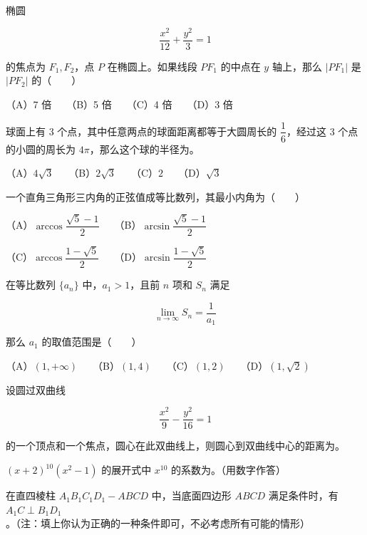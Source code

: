 \begin{question}
椭圆

\nopagebreak[4]
\[
\frac{x^2}{12}+\frac{y^2}{3}=1
\]

的焦点为 $F_1,F_2$，点 $P$ 在椭圆上。如果线段 $PF_1$ 的中点在 $y$ 轴上，那么 $|PF_1|$ 是 $|PF_2|$ 的\mbox{（　　）}

（A）7 倍　　（B）5 倍　　（C）4 倍　　（D）3 倍

\end{question}
\begin{question}
球面上有 3 个点，其中任意两点的球面距离都等于大圆周长的 $\dfrac16$，经过这 3 个点的小圆的周长为 $4\pi$，那么这个球的半径为\gkblank{}。

（A）$4\sqrt3$　　（B）$2\sqrt3$　　（C）$2$　　（D）$\sqrt3$

\end{question}
\begin{question}
一个直角三角形三内角的正弦值成等比数列，其最小内角为\mbox{（　　）}

（A）$\arccos\dfrac{\sqrt5-1}{2}$　　（B）$\arcsin\dfrac{\sqrt5-1}{2}$

（C）$\arccos\dfrac{1-\sqrt5}{2}$　　（D）$\arcsin\dfrac{1-\sqrt5}{2}$

\end{question}
\begin{question}
在等比数列 $\{a_n\}$ 中，$a_1>1$，且前 $n$ 项和 $S_n$ 满足

\nopagebreak[4]
\[
\lim_{n\to\infty}S_n=\frac1{a_1}
\]

那么 $a_1$ 的取值范围是\mbox{（　　）}

（A）$(1,+\infty)$　　（B）$(1,4)$　　（C）$(1,2)$　　（D）$(1,\sqrt2)$

\end{question}
\begin{question}
设圆过双曲线

\nopagebreak[4]
\[
\frac{x^2}{9}-\frac{y^2}{16}=1
\]

的一个顶点和一个焦点，圆心在此双曲线上，则圆心到双曲线中心的距离为\gkblank{}。

\end{question}
\begin{question}
$(x+2)^{10}(x^2-1)$ 的展开式中 $x^{10}$ 的系数为\gkblank{}。（用数字作答）

\end{question}
\begin{question}
在直四棱柱 $A_1B_1C_1D_1-ABCD$ 中，当底面四边形 $ABCD$ 满足条件\gkblank{}时，有 $A_1C\perp B_1D_1$。（注：填上你认为正确的一种条件即可，不必考虑所有可能的情形）

\end{question}
